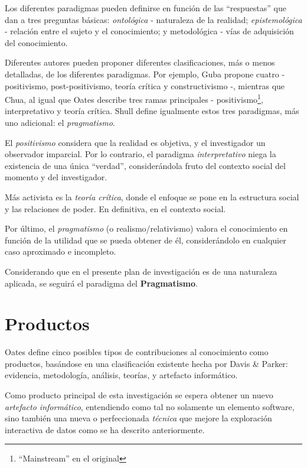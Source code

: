 Los diferentes paradigmas pueden definirse en función de las ``respuestas''
que dan a tres preguntas básicas\cite{Guba1990,Guba1994}: \emph{ontológica}
- naturaleza de la realidad; \emph{epistemológica} - relación entre el sujeto
y el conocimiento; y metodológica - vías de adquisición del conocimiento.

Diferentes autores pueden proponer diferentes clasificaciones, más o menos detalladas,
de los diferentes paradigmas. Por ejemplo, Guba\cite{Guba1990} propone cuatro -
positivismo, post-positivismo, teoría crítica y constructivismo -, mientras
que Chua\cite{Chua1986}, al igual que Oates\cite{Oates2006} describe tres ramas principales -
positivismo\footnote{``Mainstream'' en el original}, interpretativo y teoría crítica.
Shull \etal\cite{Shull2008} define igualmente estos tres paradigmas, más uno
adicional: el \emph{pragmatismo}.

El \emph{positivismo} considera que la realidad es objetiva, y el investigador
un observador imparcial. Por lo contrario, el paradigma \emph{interpretativo}
niega la existencia de una única ``verdad'', considerándola fruto del contexto
social del momento y del investigador.

Más activista es la \emph{teoría crítica}, donde el enfoque se pone en la
estructura social y las relaciones de poder. En definitiva, en el contexto
social.

Por último, el \emph{pragmatismo} (o realismo/relativismo\cite{Haack1977,Hookway2008,Pratt2016})
valora el conocimiento en función de la utilidad que se pueda obtener de él,
considerándolo en cualquier caso aproximado e incompleto\cite{Shull2008}.

\medskip

Considerando que en el presente plan de investigación es de una naturaleza
aplicada, se seguirá el paradigma del \textbf{Pragmatismo}.

\FloatBarrier

\section{Productos}
\label{subsec:productos}
Oates define cinco posibles tipos de contribuciones al conocimiento como productos, basándose
en una clasificación existente hecha por Davis \& Parker\cite{Oates2006,Davis1997}:
evidencia, metodología, análisis, teorías, y artefacto informático.

Como producto principal de esta investigación se espera obtener un nuevo
\emph{artefacto informático}, entendiendo como tal no solamente un elemento
software, sino también una nueva o perfeccionada \emph{técnica} que mejore
la exploración interactiva de datos como se ha descrito anteriormente.

